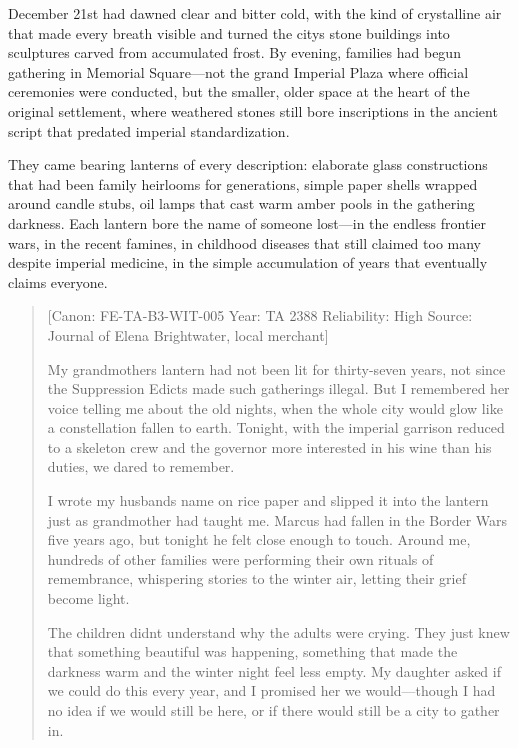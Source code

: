 December 21st had dawned clear and bitter cold, with the kind of
crystalline air that made every breath visible and turned the
city\textquotesingle s stone buildings into sculptures carved from
accumulated frost. By evening, families had begun gathering in Memorial
Square---not the grand Imperial Plaza where official ceremonies were
conducted, but the smaller, older space at the heart of the original
settlement, where weathered stones still bore inscriptions in the
ancient script that predated imperial standardization.

They came bearing lanterns of every description: elaborate glass
constructions that had been family heirlooms for generations, simple
paper shells wrapped around candle stubs, oil lamps that cast warm amber
pools in the gathering darkness. Each lantern bore the name of someone
lost---in the endless frontier wars, in the recent famines, in childhood
diseases that still claimed too many despite imperial medicine, in the
simple accumulation of years that eventually claims everyone.

\begin{quote}
{[}Canon: FE-TA-B3-WIT-005 \textbar{} Year: TA 2388 \textbar{}
Reliability: High \textbar{} Source: Journal of Elena Brightwater, local
merchant{]}

My grandmother\textquotesingle s lantern had not been lit for
thirty-seven years, not since the Suppression Edicts made such
gatherings illegal. But I remembered her voice telling me about the old
nights, when the whole city would glow like a constellation fallen to
earth. Tonight, with the imperial garrison reduced to a skeleton crew
and the governor more interested in his wine than his duties, we dared
to remember.

I wrote my husband\textquotesingle s name on rice paper and slipped it
into the lantern just as grandmother had taught me. Marcus had fallen in
the Border Wars five years ago, but tonight he felt close enough to
touch. Around me, hundreds of other families were performing their own
rituals of remembrance, whispering stories to the winter air, letting
their grief become light.

The children didn\textquotesingle t understand why the adults were
crying. They just knew that something beautiful was happening, something
that made the darkness warm and the winter night feel less empty. My
daughter asked if we could do this every year, and I promised her we
would---though I had no idea if we would still be here, or if there
would still be a city to gather in.
\end{quote}

